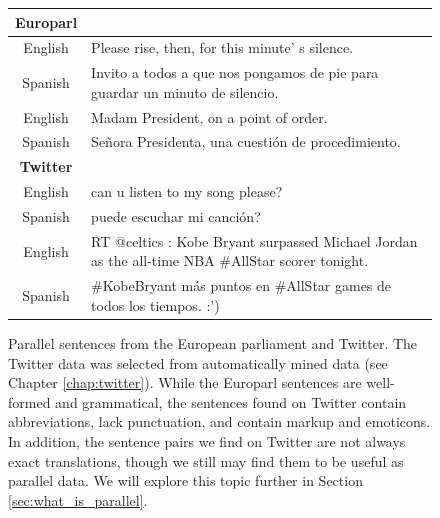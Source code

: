 \begin{figure}[ht]
\begin{tabular}{|c|l|}
\hline
{\textbf Europarl} &\\
\hline
English & Please rise, then, for this minute' s silence. \\
Spanish & \tiny Invito a todos a que nos pongamos de pie para guardar un minuto de
silencio. \\
\hline
English & Madam President, on a point of order. \\
Spanish & Señora Presidenta, una cuestión de procedimiento. \\
\hline
\hline
\textbf{Twitter} &\\
\hline
English & can u listen to my song please? \\
Spanish & puede escuchar mi canci\'{o}n? \\
\hline
English & \tiny RT @celtics : Kobe Bryant surpassed Michael Jordan as the all-time NBA
\#AllStar scorer tonight.\\
Spanish & \tiny \#KobeBryant m\'{a}s puntos en \#AllStar games de todos los tiempos. :')\\
\hline
\end{tabular}
\caption{Parallel sentences from the European parliament and Twitter. The
Twitter data was selected from automatically mined data (see Chapter
\ref{chap:twitter}). While the Europarl sentences are well-formed and
grammatical, the sentences found on Twitter contain abbreviations, lack
punctuation, and contain markup and emoticons. In addition, the sentence pairs
we find on Twitter are not always exact translations, though we still may find
them to be useful as parallel data. We will explore this topic further in
Section \ref{sec:what_is_parallel}.}
\label{fig:europarl_twitter}
\end{figure}



